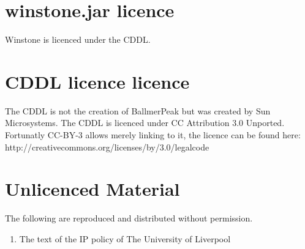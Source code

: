 \section{winstone.jar licence}
Winstone is licenced under the CDDL.


\section{CDDL licence licence}
The CDDL is not the creation of BallmerPeak but was created by Sun Microsystems.
The CDDL is licenced under CC Attribution 3.0 Unported. Fortunatly CC-BY-3
allows merely linking to it, the licence can be found here:
http://creativecommons.org/licenses/by/3.0/legalcode

\section{Unlicenced Material}
The following are reproduced and distributed without permission.
\begin{enumerate}
\item The text of the IP policy of The University of Liverpool
\end{enumerate}
